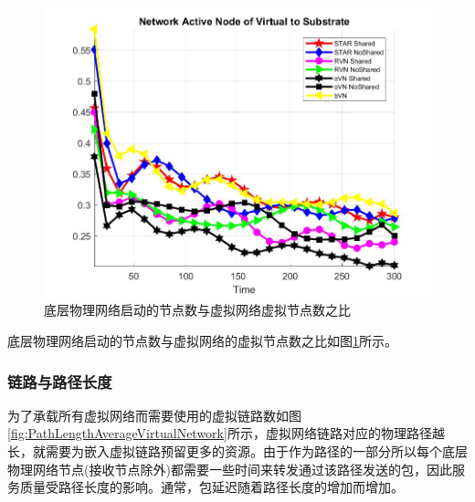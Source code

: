 \begin{figure}[htbp]
\begin{minipage}{0.4\textwidth}
\includegraphics[width=\textwidth]{figures/ActiveNodeSubVir2VirNet}
\caption{底层物理网络启动的节点数与虚拟网络虚拟节点数之比}\label{fig:ActiveNodeSubVir2VirNet}
\end{minipage}\vspace{\baselineskip}
\end{figure}
底层物理网络启动的节点数与虚拟网络的虚拟节点数之比如图\ref{fig:ActiveNodeSubVir2VirNet}所示。


\subsubsection{链路与路径长度}
为了承载所有虚拟网络而需要使用的虚拟链路数如图\ref{fig:PathLengthAverageVirtualNetwork}所示，虚拟网络链路对应的物理路径越长，就需要为嵌入虚拟链路预留更多的资源。由于作为路径的一部分所以每个底层物理网络节点(接收节点除外)都需要一些时间来转发通过该路径发送的包，因此服务质量受路径长度的影响。通常，包延迟随着路径长度的增加而增加。

